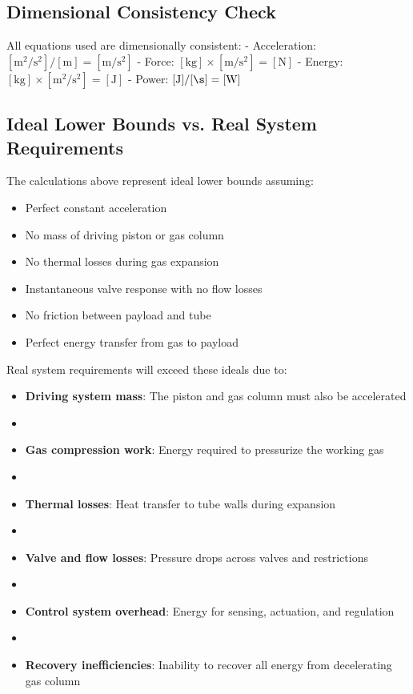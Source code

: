 \subsection{Dimensional Consistency Check}
All equations used are dimensionally consistent:
- Acceleration: $[\text{m}^2/\text{s}^2] / [\text{m}] = [\text{m}/\text{s}^2]$ \checkmark
- Force: $[\text{kg}] \times [\text{m}/\text{s}^2] = [\text{N}]$ \checkmark
- Energy: $[\text{kg}] \times [\text{m}^2/\text{s}^2] = [\text{J}]$ \checkmark
- Power: $[\text{J}] / [\s] = [\text{W}]$ \checkmark

\subsection{Ideal Lower Bounds vs. Real System Requirements}
The calculations above represent ideal lower bounds assuming:
\begin{itemize}
    \item Perfect constant acceleration
    \item No mass of driving piston or gas column
    \item No thermal losses during gas expansion
    \item Instantaneous valve response with no flow losses
    \item No friction between payload and tube
    \item Perfect energy transfer from gas to payload
\end{itemize}

Real system requirements will exceed these ideals due to:
\begin{itemize}
    \item \textbf{Driving system mass}: The piston and gas column must also be accelerated
    \item \item \textbf{Gas compression work}: Energy required to pressurize the working gas
    \item \item \textbf{Thermal losses}: Heat transfer to tube walls during expansion
    \item \item \textbf{Valve and flow losses}: Pressure drops across valves and restrictions
    \item \item \textbf{Control system overhead}: Energy for sensing, actuation, and regulation
    \item \item \textbf{Recovery inefficiencies}: Inability to recover all energy from decelerating gas column
\end{itemize}

